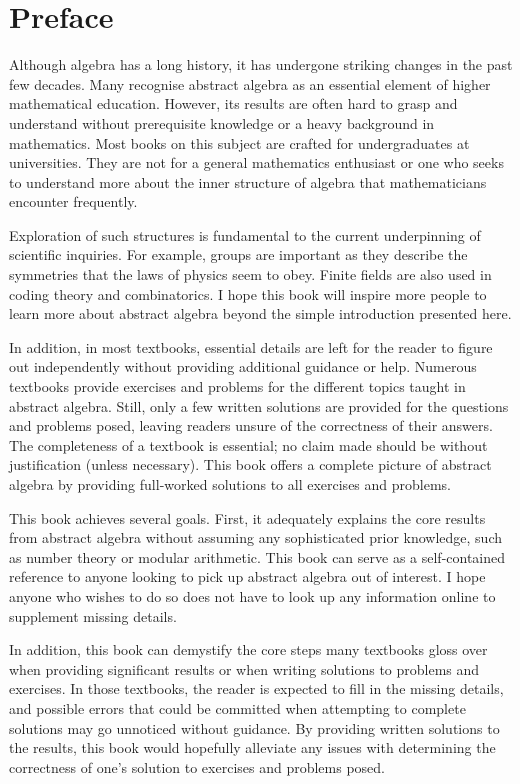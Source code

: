 \chapter{Preface}
Although algebra has a long history, it has undergone striking changes in the past few decades. Many recognise abstract algebra as an essential element of higher mathematical education. However, its results are often hard to grasp and understand without prerequisite knowledge or a heavy background in mathematics. Most books on this subject are crafted for undergraduates at universities. They are not for a general mathematics enthusiast or one who seeks to understand more about the inner structure of algebra that mathematicians encounter frequently.

Exploration of such structures is fundamental to the current underpinning of scientific inquiries. For example, groups are important as they describe the symmetries that the laws of physics seem to obey. Finite fields are also used in coding theory and combinatorics. I hope this book will inspire more people to learn more about abstract algebra beyond the simple introduction presented here.

In addition, in most textbooks, essential details are left for the reader to figure out independently without providing additional guidance or help. Numerous textbooks provide exercises and problems for the different topics taught in abstract algebra. Still, only a few written solutions are provided for the questions and problems posed, leaving readers unsure of the correctness of their answers. The completeness of a textbook is essential; no claim made should be without justification (unless necessary). This book offers a complete picture of abstract algebra by providing full-worked solutions to all exercises and problems.

This book achieves several goals. First, it adequately explains the core results from abstract algebra without assuming any sophisticated prior knowledge, such as number theory or modular arithmetic. This book can serve as a self-contained reference to anyone looking to pick up abstract algebra out of interest. I hope anyone who wishes to do so does not have to look up any information online to supplement missing details.

In addition, this book can demystify the core steps many textbooks gloss over when providing significant results or when writing solutions to problems and exercises. In those textbooks, the reader is expected to fill in the missing details, and possible errors that could be committed when attempting to complete solutions may go unnoticed without guidance. By providing written solutions to the results, this book would hopefully alleviate any issues with determining the correctness of one's solution to exercises and problems posed.


